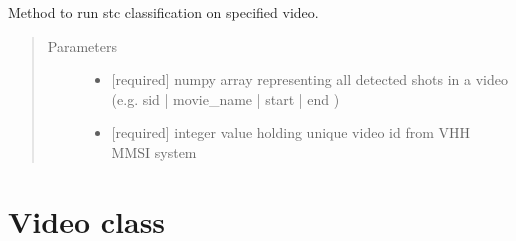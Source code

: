 \documentclass[letterpaper,10pt,english,openany,oneside]{sphinxmanual}
\begin{document}
\begin{fulllineitems}

\begin{fulllineitems}
\label{\detokenize{STC:stc.STC.STC.runOnSingleVideo}}
Method to run stc classification on specified video.
\begin{quote}\begin{description}
\item[{Parameters}] \leavevmode\begin{itemize}
\item {} 
 \textendash{} {[}required{]} numpy array representing all detected shots in a video
(e.g. sid | movie\_name | start | end )

\item {} 
 \textendash{} {[}required{]} integer value holding unique video id from VHH MMSI system

\end{itemize}

\end{description}\end{quote}

\end{fulllineitems}


\end{fulllineitems}



\section{Video class}
\label{\detokenize{Video:video-class}}\label{\detokenize{Video::doc}}
\end{document}

